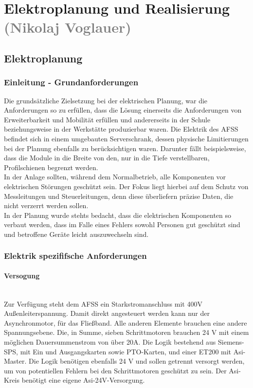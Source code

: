 \section{Elektroplanung und Realisierung \textcolor{gray}{(Nikolaj Voglauer)}}

\subsection{Elektroplanung}
\label{sec:Elektroplanung}

\subsubsection{Einleitung - Grundanforderungen}
    Die grundsätzliche Zielsetzung bei der elektrischen Planung, war die Anforderungen so zu erfüllen, dass die Lösung einerseits die Anforderungen von Erweiterbarkeit und Mobilität erfüllen und andererseits in der Schule beziehungsweise in der Werkstätte produzierbar waren. Die Elektrik des AFSS befindet sich in einem umgebauten Serverschrank, dessen physische Limitierungen bei der Planung ebenfalls zu berücksichtigen waren. Darunter fällt beispielsweise, dass die Module in die Breite von den, nur in die Tiefe verstellbaren, Profilschienen begrenzt werden.\\
    In der Anlage sollten, während dem Normalbetrieb, alle Komponenten vor elektrischen Störungen geschützt sein. Der Fokus liegt hierbei auf dem Schutz von Messleitungen und Steuerleitungen, denn diese überliefern präzise Daten, die nicht verzerrt werden sollen.\\ 
    In der Planung wurde stehts bedacht, dass die elektrischen Komponenten so verbaut werden, dass im Falle eines Fehlers sowohl Personen gut geschützt sind und betroffene Geräte leicht auszuwechseln sind.\\

\subsubsection{Elektrik spezififsche Anforderungen}
\label{sec:Elektrik spezififsche Anforderungen}

    \paragraph{Versogung}\mbox{}\\
    Zur Verfügung steht dem AFSS ein Starkstromanschluss mit 400V Außenleiterspannung. Damit direkt angesteuert werden kann nur der Asynchronmotor, für das Fließband. Alle anderen Elemente brauchen eine andere Spannungsebene. Die, in Summe, sieben Schrittmotoren brauchen 24 V mit einem möglichen Dauersummenstrom von über 20A. Die Logik bestehend aus Siemens-SPS, mit Ein und Ausgangskarten sowie PTO-Karten, und einer ET200 mit Asi-Master. Die Logik benötigen ebenfalls 24 V und sollen getrennt versorgt werden, um von potentiellen Fehlern bei den Schrittmotoren geschützt zu sein. Der Asi-Kreis benötigt eine eigene Asi-24V-Versorgung.

